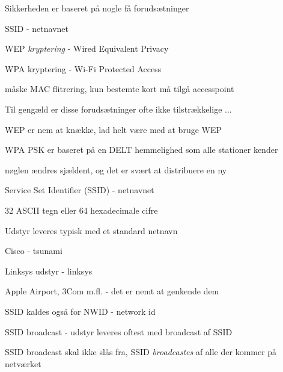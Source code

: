 \documentclass[20pt,landscape,a4paper,footrule]{foils}
\begin{document}


\begin{list1}
\item Sikkerheden er baseret på nogle få forudsætninger
  \begin{list2}
  \item SSID - netnavnet
  \item WEP \emph{kryptering} - Wired Equivalent Privacy
  \item WPA kryptering - Wi-Fi Protected Access
  \item måske MAC flitrering, kun bestemte kort må tilgå accesspoint
  \end{list2}
\item Til gengæld er disse forudsætninger ofte ikke tilstrækkelige ...
  \begin{list2}
  \item WEP er nem at knække, lad helt være med at bruge WEP
  \item WPA PSK er baseret på en DELT hemmelighed som alle stationer kender
  \item nøglen ændres sjældent, og det er svært at distribuere en ny
  \end{list2}

\end{list1}



\begin{list1}
\item Service Set Identifier (SSID) - netnavnet
\item 32 ASCII tegn eller 64 hexadecimale cifre
\item Udstyr leveres typisk med et standard netnavn
\begin{list2}
\item Cisco - tsunami
\item Linksys udstyr - linksys
\item Apple Airport, 3Com m.fl. - det er nemt at genkende dem
\end{list2}
\item SSID kaldes også for NWID - network id
\item SSID broadcast - udstyr leveres oftest med broadcast af SSID
\item SSID broadcast skal ikke slås fra, SSID \emph{broadcastes} af alle der kommer på netværket
\end{list1}
\end{document}
